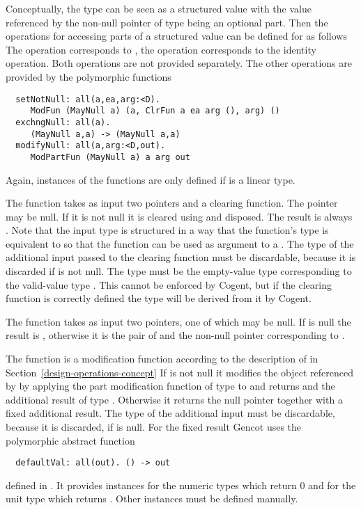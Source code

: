 Conceptually, the type  can be seen as a structured value with the value referenced by the non-null pointer of type  being
an optional part. Then the operations for accessing parts of a structured value can be defined for  as follows
The operation  corresponds to , the operation  corresponds to the
identity operation. Both operations are not provided separately. The other operations are provided
by the polymorphic functions
\begin{verbatim}
  setNotNull: all(a,ea,arg:<D). 
     ModFun (MayNull a) (a, ClrFun a ea arg (), arg) ()
  exchngNull: all(a).
     (MayNull a,a) -> (MayNull a,a)
  modifyNull: all(a,arg:<D,out).
     ModPartFun (MayNull a) a arg out
\end{verbatim}
Again, instances of the functions are only defined if  is a linear type. 

The function  takes as input two pointers and a clearing function. The pointer  may be null. 
If it is not null it is cleared using  and disposed. The result is always . Note that the input type is
structured in a way that the function's type is equivalent to  so that the function can be used
as argument to a . The type  of the additional input passed to the clearing function must be discardable, because
it is discarded if  is not null. The type  must be the empty-value type corresponding to the valid-value type . This 
cannot be enforced by Cogent, but if the clearing function is correctly defined the type  will be derived from it by Cogent.

The function  takes as input two pointers, one of which may be null. If  is null the result is
, otherwise it is the pair of  and the non-null pointer corresponding to .

The function  is a 
modification function according to the description of  in Section~\ref{design-operations-concept} 
If  is not null it modifies the object referenced by  by applying the part modification function  of type 
 to  and returns  and the additional result of type . Otherwise it returns the null pointer 
together with a fixed additional result. The type  of the additional input
must be discardable, because it is discarded, if  is null. For the fixed result Gencot uses the polymorphic abstract function
\begin{verbatim}
  defaultVal: all(out). () -> out
\end{verbatim}
defined in . 
It provides instances for the numeric types  which return 0 and for the unit type \code{()} which returns \code{()}. 
Other instances must be defined manually.

